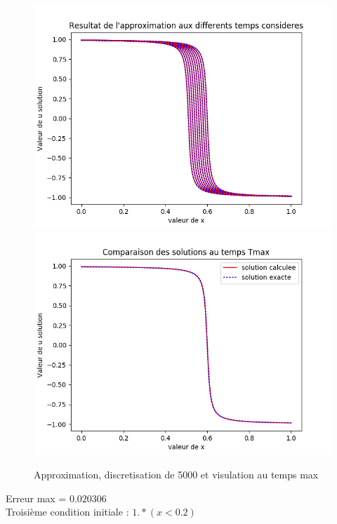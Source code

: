 \documentclass[12pt]{article}
\begin{document}
 \begin{figure}[H]
	\centering
	\includegraphics[scale=0.40]{1D_c1_5000_init2.png}
	\includegraphics[scale=0.40]{Temp_max_c1_5000_s1_i2.png}
	\caption{Approximation, discretisation de 5000 et visulation au temps max}
	\label{1D}
	\end{figure}
Erreur max = $0.020306$
\\Troisième condition initiale : $1.*(x<0.2)$
\end{document}
